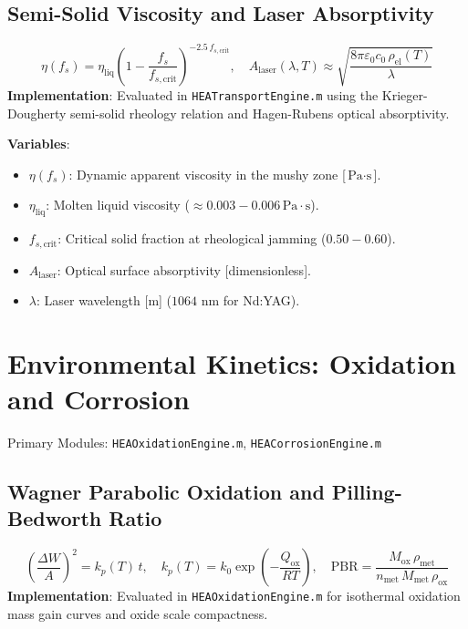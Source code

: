 \documentclass[11pt,a4paper]{article}
\begin{document}
\subsection{Semi-Solid Viscosity and Laser Absorptivity}
\begin{equation}
\eta(f_s) = \eta_{\text{liq}} \left(1 - \frac{f_s}{f_{s, \text{crit}}}\right)^{-2.5 \, f_{s, \text{crit}}}, \quad A_{\text{laser}}(\lambda, T) \approx \sqrt{\frac{8 \pi \varepsilon_0 c_0 \, \rho_{\text{el}}(T)}{\lambda}}
\end{equation}
\textbf{Implementation}: Evaluated in \texttt{HEATransportEngine.m} using the Krieger-Dougherty semi-solid rheology relation and Hagen-Rubens optical absorptivity.

\noindent\textbf{Variables}:
\begin{itemize}
  \item $\eta(f_s)$: Dynamic apparent viscosity in the mushy zone [$\text{Pa}\cdot\text{s}$].
  \item $\eta_{\text{liq}}$: Molten liquid viscosity ($\approx 0.003 - 0.006 \, \text{Pa}\cdot\text{s}$).
  \item $f_{s, \text{crit}}$: Critical solid fraction at rheological jamming ($0.50 - 0.60$).
  \item $A_{\text{laser}}$: Optical surface absorptivity [dimensionless].
  \item $\lambda$: Laser wavelength [$\text{m}$] ($1064\text{ nm}$ for Nd:YAG).
\end{itemize}

\section{Environmental Kinetics: Oxidation and Corrosion}
Primary Modules: \texttt{HEAOxidationEngine.m}, \texttt{HEACorrosionEngine.m}

\subsection{Wagner Parabolic Oxidation and Pilling-Bedworth Ratio}
\begin{equation}
\left(\frac{\Delta W}{A}\right)^2 = k_p(T) \, t, \quad k_p(T) = k_0 \exp\left(-\frac{Q_{\text{ox}}}{R T}\right), \quad \text{PBR} = \frac{M_{\text{ox}} \, \rho_{\text{met}}}{n_{\text{met}} \, M_{\text{met}} \, \rho_{\text{ox}}}
\end{equation}
\textbf{Implementation}: Evaluated in \texttt{HEAOxidationEngine.m} for isothermal oxidation mass gain curves and oxide scale compactness.
\end{document}
